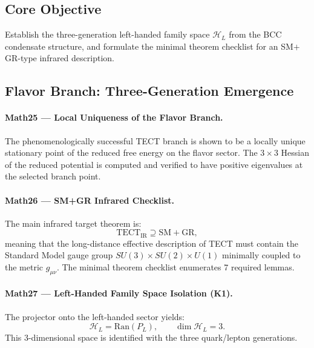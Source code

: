 \documentclass[reprint,aps,pre,onecolumn,superscriptaddress,amsmath,amssymb]{revtex4-2}
\begin{document}
\subsection{Core Objective}

Establish the three-generation left-handed family space $\mathcal{H}_{L}$
from the BCC condensate structure, and formulate the minimal theorem
checklist for an SM$+$GR-type infrared description.

\subsection{Flavor Branch: Three-Generation Emergence}

\paragraph{Math25 --- Local Uniqueness of the Flavor Branch.}
The phenomenologically successful TECT branch is shown to be a locally
unique stationary point of the reduced free energy on the flavor sector.
The $3\times 3$ Hessian of the reduced potential is computed and verified
to have positive eigenvalues at the selected branch point.

\paragraph{Math26 --- SM+GR Infrared Checklist.}
The main infrared target theorem is:
\begin{equation}
  \boxed{
    \text{TECT}_{\mathrm{IR}} \supseteq \text{SM} + \text{GR},
  }
  \label{eq:IR-limit}
\end{equation}
meaning that the long-distance effective description of TECT
must contain the Standard Model gauge group $SU(3)\times SU(2)\times U(1)$
minimally coupled to the metric $g_{\mu\nu}$.
The minimal theorem checklist enumerates 7 required lemmas.

\paragraph{Math27 --- Left-Handed Family Space Isolation (K1).}
The projector onto the left-handed sector yields:
\begin{equation}
  \mathcal{H}_{L} = \mathrm{Ran}(P_{L}),
  \qquad
  \dim \mathcal{H}_{L} = 3.
  \label{eq:HL-dim}
\end{equation}
This 3-dimensional space is identified with the three quark/lepton generations.
\end{document}
